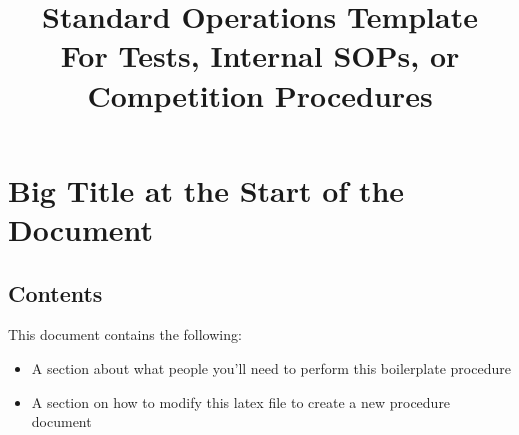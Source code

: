 

\title{
\Huge Standard Operations Template\\
\vspace{1cm}
\Large For Tests, Internal SOPs, or Competition Procedures}








\section{Big Title at the Start of the Document}


\subsection{Contents}
This document contains the following:
\begin{itemize}
    \item A section about what people you'll need to perform this boilerplate procedure
    \item A section on how to modify this latex file to create a new procedure document
\end{itemize}

